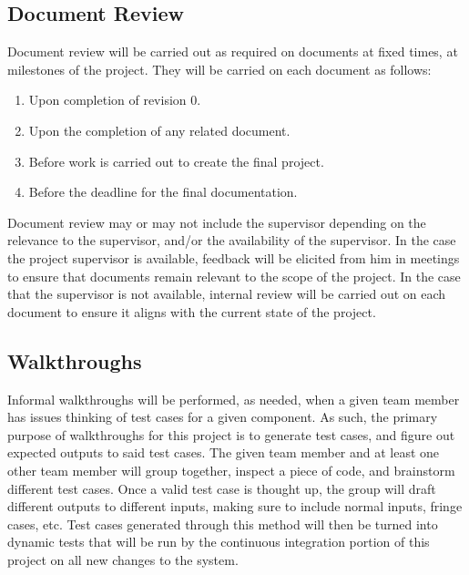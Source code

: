 \documentclass[12pt, titlepage]{article}
\begin{document}
\subsection{Document Review}

Document review will be carried out as required on documents at fixed times, at milestones of the project. They will be carried on each document as follows:

\begin{enumerate}
    \item Upon completion of revision 0.
    \item Upon the completion of any related document.
    \item Before work is carried out to create the final project.
    \item Before the deadline for the final documentation.
\end{enumerate}

\noindent Document review may or may not include the supervisor depending on the relevance to the supervisor, and/or the availability of the supervisor. In the case the project supervisor is available, feedback will be elicited from him in meetings to ensure that documents remain relevant to the scope of the project. In the case that the supervisor is not available, internal review will be carried out on each document to ensure it aligns with the current state of the project.

\subsection{Walkthroughs}

Informal walkthroughs will be performed, as needed, when a given team member has issues thinking of test cases for a given component. As such, the primary purpose of walkthroughs for this project is to generate test cases, and figure out expected outputs to said test cases. The given team member and at least one other team member will group together, inspect a piece of code, and brainstorm different test cases. Once a valid test case is thought up, the group will draft different outputs to different inputs, making sure to include normal inputs, fringe cases, etc. Test cases generated through this method will then be turned into dynamic tests that will be run by the continuous integration portion of this project on all new changes to the system.
				



\end{document}
